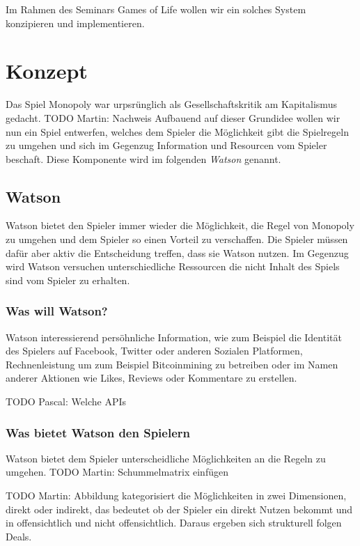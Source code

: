 \documentclass[german]{cgspaper} %
\newcommand{\Martin}[1]{ \textcolor{colorMartin}{TODO Martin:} #1 }
\newcommand{\Pascal}[1]{ \textcolor{colorPascal}{TODO Pascal:} #1 }
\newcommand{\neuerBegriff}[1]{\textit{#1}}
\begin{document}
Im Rahmen des Seminars Games of Life wollen wir ein solches System konzipieren und implementieren.

\section{Konzept}

Das Spiel Monopoly war urpsrünglich als Gesellschaftskritik am Kapitalismus gedacht. \Martin{Nachweis} 
Aufbauend auf dieser Grundidee wollen wir nun ein Spiel entwerfen, welches dem Spieler die Möglichkeit gibt die Spielregeln zu umgehen und sich im Gegenzug Information und Resourcen vom Spieler beschaft. 
Diese Komponente wird im folgenden \neuerBegriff{Watson} genannt.

\subsection{Watson}

Watson bietet den Spieler immer wieder die Möglichkeit, die Regel von Monopoly zu umgehen und dem Spieler so einen Vorteil zu verschaffen.
Die Spieler müssen dafür aber aktiv die Entscheidung treffen, dass sie Watson nutzen.
Im Gegenzug wird Watson versuchen unterschiedliche Ressourcen die nicht Inhalt des Spiels sind vom Spieler zu erhalten.



\subsubsection{Was will Watson?}

Watson interessierend persöhnliche Information, wie zum Beispiel die Identität des Spielers auf Facebook, Twitter oder anderen Sozialen Platformen, Rechnenleistung um zum Beispiel Bitcoinmining zu betreiben oder im Namen anderer Aktionen wie Likes, Reviews oder Kommentare zu erstellen.

\Pascal{Welche APIs}

\subsubsection{Was bietet Watson den Spielern}

Watson bietet dem Spieler unterscheidliche Möglichkeiten an die Regeln zu umgehen.
\Martin{Schummelmatrix einfügen}

\Martin{Abbildung} kategorisiert die Möglichkeiten in zwei Dimensionen, direkt oder indirekt, das bedeutet ob der Spieler ein direkt Nutzen bekommt und in offensichtlich und nicht offensichtlich.
Daraus ergeben sich strukturell folgen Deals.
\end{document}
